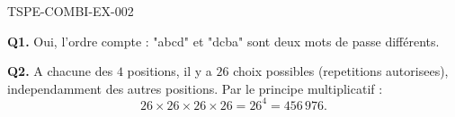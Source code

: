 \begin{corrige}{TSPE-COMBI-EX-002}

\textbf{Q1.} Oui, l'ordre compte : "abcd" et "dcba" sont deux mots de passe différents.

\textbf{Q2.} A chacune des $4$ positions, il y a $26$ choix possibles (repetitions autorisees), independamment des autres positions. Par le principe multiplicatif :
\[
  26 \times 26 \times 26 \times 26 = 26^4 = \boxed{456\,976}.
\]

\end{corrige}
